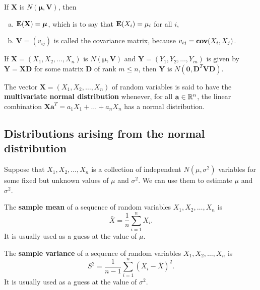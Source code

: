 \begin{theorem}
If $\mathbf{X}$ is $N(\boldsymbol{\mu}, \mathbf{V})$, then 
\begin{enumerate}[(a)]
    \item $\mathbf{E}(\mathbf{X}) = \boldsymbol{\mu}$, which is to say that $\mathbf{E}(X_i) = \mu_i$ for all $i$,
    \item $\mathbf{V} = (v_{ij})$ is called the covariance matrix, because $v_{ij} = \mathbf{cov}(X_i , X_j)$. 
\end{enumerate}
\end{theorem}

\begin{theorem}
If $\mathbf{X}=\left(X_{1}, X_{2}, \dots, X_{n}\right)$ is $N(\boldsymbol{\mu}, \mathbf{V})$ and $\mathbf{Y}=\left(Y_{1}, Y_{2}, \dots, Y_{m}\right)$ is given by $\mathbf{Y} = \mathbf{XD}$ for some matrix $\mathbf{D}$ of rank $m \leq n$, then $\mathbf{Y}$ is $N\left(\mathbf{0}, \mathbf{D}^T \mathbf{V} \mathbf{D}\right)$.
\end{theorem}

\begin{definition}
The vector $\mathbf{X}=\left(X_{1}, X_{2}, \dots, X_{n}\right)$ of random variables is said to have the 
\textbf{multivariate normal distribution} whenever, for all $\mathbf{a} \in \mathbb{R}^n$, the linear combination $\mathbf{Xa}^T = a_1 X_1 + \dots + a_n X_n$ has a normal distribution.
\end{definition}

\subsection{Distributions arising from the normal distribution}
Suppose that $X_1, X_2, \dots , X_n$ is a collection 
of independent $N(\mu, \sigma^2)$ variables for some fixed but unknown values of $\mu$ and $\sigma^2$. We can use them to estimate $\mu$ and $\sigma^2$.

\begin{definition}
The \textbf{sample mean} of a sequence of random variables $X_1, X_2, \dots , X_n$ is 
\begin{equation*}
    \bar{X} = \frac{1}{n} \sum_{i=1}^n X_i.
\end{equation*}
It is usually used as a guess at the value of $\mu$.
\end{definition}

\begin{definition}
The \textbf{sample variance} of a sequence of random variables $X_1, X_2, \dots , X_n$ is 
\begin{equation*}
    S^2 = \frac{1}{n-1}\sum_{i=1}^n (X_i - \bar{X})^2.
\end{equation*}
It is usually used as a guess at the value of $\sigma^2$.
\end{definition}

